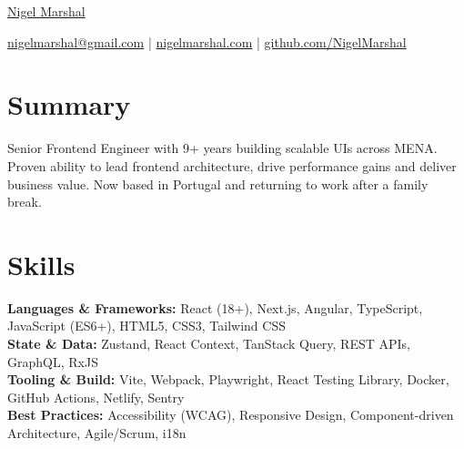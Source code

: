 \documentclass[10pt,letterpaper]{article}
\begin{document}

\centerline{\Huge \href{https://nigelmarshal.com}{Nigel Marshal}}

\vspace{5pt}


\centerline{\href{mailto:nigelmarshal@gmail.com}{nigelmarshal@gmail.com} | \href{https://nigelmarshal.com}{nigelmarshal.com} | \href{https://github.com/NigelMarshal}{github.com/NigelMarshal}}

\vspace{-10pt}
\section*{Summary}
Senior Frontend Engineer with 9+ years building scalable UIs across MENA. Proven ability to lead frontend architecture, drive performance gains and deliver business value. Now based in Portugal and returning to work after a family break.
\vspace{-9.5pt}


\section*{Skills}
\textbf{Languages \& Frameworks:} React (18+), Next.js, Angular, TypeScript, JavaScript (ES6+), HTML5, CSS3, Tailwind CSS \\
\textbf{State \& Data:} Zustand, React Context, TanStack Query, REST APIs, GraphQL, RxJS \\
\textbf{Tooling \& Build:} Vite, Webpack, Playwright, React Testing Library, Docker, GitHub Actions, Netlify, Sentry \\
\textbf{Best Practices:} Accessibility (WCAG), Responsive Design, Component-driven Architecture, Agile/Scrum, i18n
\vspace{-9.5pt}
\end{document}
